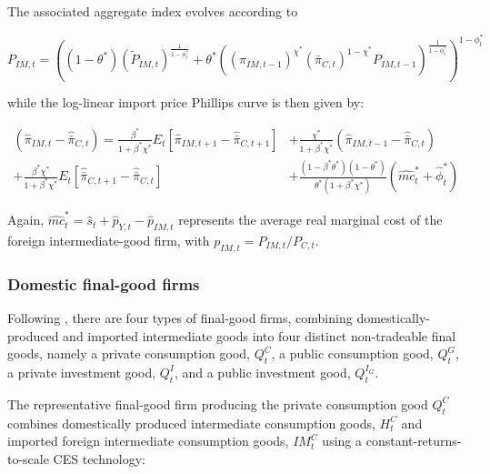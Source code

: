 \documentclass[a4paper,11pt]{article}
\numberwithin{equation}{section}
\begin{document}
	The associated aggregate index evolves according to
	
	\begin{equation}
	P_{IM,t}=\left(\left(1-\theta^*\right)\left(\tilde{P}_{IM,t}\right)^{\frac{1}{1-\phi_t^*}}+\theta^*\left(\left(\pi_{IM,t-1}\right)^{\chi^*}\left(\bar{\pi}_{C,t}\right)^{1-\chi^*}P_{IM,t-1}\right)^{\frac{1}{1-\phi_t^*}}\right)^{1-\phi_t^*}
	\end{equation}
	
	while the log-linear import price Phillips curve is then given by:
	
	\begin{equation} \label{phillips_import}
	\begin{split}
	\left(\hat{\pi}_{IM,t}-\hat{\bar{\pi}}_{C,t}\right)=\frac{\beta^*}{1+\beta^*\chi^*}E_t\left[\hat{\pi}_{IM,t+1}-\hat{\bar{\pi}}_{C,t+1}\right]& +\frac{\chi^*}{1+\beta^*\chi^*}\left(\hat{\pi}_{IM,t-1}-\hat{\bar{\pi}}_{C,t}\right)  \\ +\frac{\beta^*\chi^*}{1+\beta^*\chi^*}E_t\left[\hat{\bar{\pi}}_{C,t+1}-\hat{\bar{\pi}}_{C,t}\right]&+\frac{\left(1-\beta^*\theta^*\right)\left(1-\theta^*\right)}{\theta^*\left(1+\beta^*\chi^*\right)}\left(\widehat{mc}^*_t+\hat{\phi}^*_t\right)
	\end{split}
	\end{equation}
	
	Again, $\widehat{mc}^*_t=\hat{s}_t+\hat{p}_{Y,t}-\hat{p}_{IM,t}$ represents the average real marginal cost of the foreign intermediate-good firm, with $p_{IM,t}=P_{IM,t}/P_{C,t}$.
	
	
	\subsubsection{Domestic final-good firms}
	
	Following \cite{christoffel2008}, there are four types of final-good firms, combining domestically-produced and imported intermediate goods into four distinct non-tradeable final goods, namely a private consumption good, $Q_t^C$, a public consumption good, $Q_t^G$, a private investment good, $Q_t^I$, and a public investment good, $Q_t^{I_G}$.
	
	The representative final-good firm producing the private consumption good $Q_t^C$ combines domestically produced intermediate consumption goods, $H_t^C$ and imported foreign intermediate consumption goods, $IM_t^C$ using a constant-returns-to-scale CES technology:
	
\end{document}
